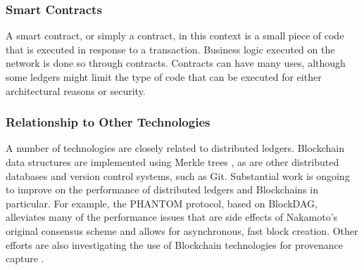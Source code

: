 \subsubsection{Smart Contracts}
A smart contract, or simply a contract, in this context is a small piece of code
that is executed in response to a transaction. Business logic executed on the
network is done so through contracts. Contracts can have many uses, although
some ledgers might limit the type of code that can be executed for either
architectural reasons or security.

\subsubsection{Relationship to Other Technologies}
A number of technologies are closely related to distributed ledgers.
Blockchain data structures are implemented using Merkle trees
\cite{merkle_digital_1987}, as are other distributed databases and version
control systems, such as Git. Substantial work is ongoing to improve
on the performance of distributed ledgers and Blockchains in particular. For
example, the PHANTOM protocol, based on BlockDAG, alleviates many of the
performance issues that are side effects of Nakamoto's original consensus
scheme and allows for asynchronous, fast block creation. Other efforts are also
investigating the use of Blockchain technologies for provenance capture
\cite{richard_brooks_and_anthony_skjellum_using_2017}\cite{worley_2018}.

